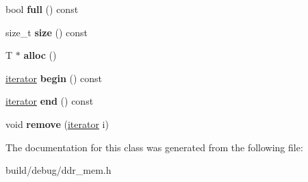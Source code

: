 \begin{DoxyCompactItemize}
\item 
\hypertarget{classRequestQueue_a356014fe9b3e72b5cfcdd76bb3689328}{bool {\bfseries full} () const }\label{classRequestQueue_a356014fe9b3e72b5cfcdd76bb3689328}

\item 
\hypertarget{classRequestQueue_ad38086a975ee9d2c248edf746cc1eb0e}{size\-\_\-t {\bfseries size} () const }\label{classRequestQueue_ad38086a975ee9d2c248edf746cc1eb0e}

\item 
\hypertarget{classRequestQueue_a87be98aa9318f21b02489e051355ace5}{T $\ast$ {\bfseries alloc} ()}\label{classRequestQueue_a87be98aa9318f21b02489e051355ace5}

\item 
\hypertarget{classRequestQueue_acd433ae477b91236b17ec0225205b52a}{\hyperlink{structRequestQueue_1_1iterator}{iterator} {\bfseries begin} () const }\label{classRequestQueue_acd433ae477b91236b17ec0225205b52a}

\item 
\hypertarget{classRequestQueue_a950534759815da071a4709f3013fbacf}{\hyperlink{structRequestQueue_1_1iterator}{iterator} {\bfseries end} () const }\label{classRequestQueue_a950534759815da071a4709f3013fbacf}

\item 
\hypertarget{classRequestQueue_a3a070fe9dc7ec6894ae72cf930fef155}{void {\bfseries remove} (\hyperlink{structRequestQueue_1_1iterator}{iterator} i)}\label{classRequestQueue_a3a070fe9dc7ec6894ae72cf930fef155}

\end{DoxyCompactItemize}


The documentation for this class was generated from the following file\-:\begin{DoxyCompactItemize}
\item 
build/debug/ddr\-\_\-mem.\-h\end{DoxyCompactItemize}
